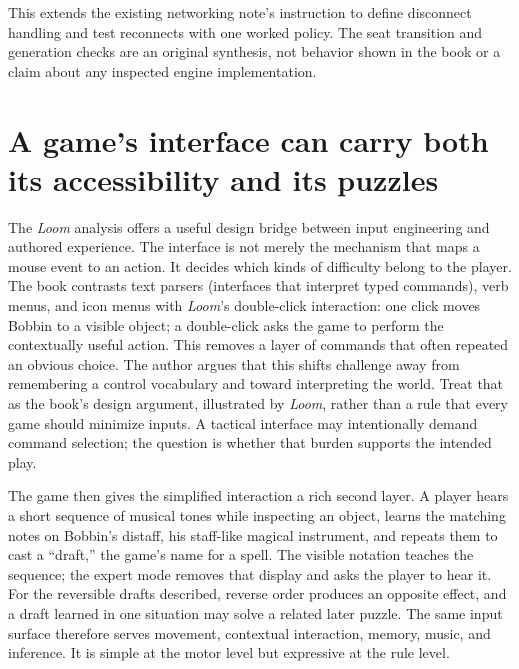 This extends the existing networking note's instruction to define disconnect handling and test reconnects with one worked policy. The seat transition and generation checks are an original synthesis, not behavior shown in the book or a claim about any inspected engine implementation.

\section{A game's interface can carry both its accessibility and its puzzles}\label{06-engine-ii-ch047-a-games-interface-can-carry-both-its-accessibility-and-its-puzzles}

\hypertarget{06-engine-ii-ch047-a-games-interface-can-carry-both-its-accessibility-and-its-puzzles}{}

The \emph{Loom} analysis offers a useful design bridge between input engineering and authored experience. The interface is not merely the mechanism that maps a mouse event to an action. It decides which kinds of difficulty belong to the player. The book contrasts text parsers (interfaces that interpret typed commands), verb menus, and icon menus with \emph{Loom}'s double-click interaction: one click moves Bobbin to a visible object; a double-click asks the game to perform the contextually useful action. This removes a layer of commands that often repeated an obvious choice. The author argues that this shifts challenge away from remembering a control vocabulary and toward interpreting the world. Treat that as the book's design argument, illustrated by \emph{Loom}, rather than a rule that every game should minimize inputs. A tactical interface may intentionally demand command selection; the question is whether that burden supports the intended play.

The game then gives the simplified interaction a rich second layer. A player hears a short sequence of musical tones while inspecting an object, learns the matching notes on Bobbin's distaff, his staff-like magical instrument, and repeats them to cast a ``draft,'' the game's name for a spell. The visible notation teaches the sequence; the expert mode removes that display and asks the player to hear it. For the reversible drafts described, reverse order produces an opposite effect, and a draft learned in one situation may solve a related later puzzle. The same input surface therefore serves movement, contextual interaction, memory, music, and inference. It is simple at the motor level but expressive at the rule level.

